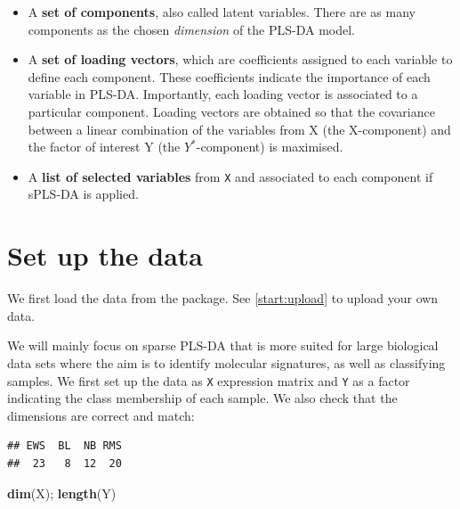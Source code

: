 \documentclass[]{book}
\newenvironment{Shaded}{\begin{snugshade}}{\end{snugshade}}
\newcommand{\KeywordTok}[1]{\textcolor[rgb]{0.13,0.29,0.53}{\textbf{#1}}}
\newcommand{\NormalTok}[1]{#1}
\newcommand{\OperatorTok}[1]{\textcolor[rgb]{0.81,0.36,0.00}{\textbf{#1}}}
\newcommand{\StringTok}[1]{\textcolor[rgb]{0.31,0.60,0.02}{#1}}
\begin{document}
\begin{itemize}
\item
  A \textbf{set of components}, also called latent variables. There are as many components as the chosen
  \emph{dimension} of the PLS-DA model.
\item
  A \textbf{set of loading vectors}, which are coefficients assigned to each variable to define each component. These coefficients indicate the importance of each variable in PLS-DA. Importantly, each loading vector is associated to a particular component. Loading vectors are obtained so that the covariance between a linear combination of the variables from X (the X-component) and the factor of interest Y (the \(Y^*\)-component) is maximised.
\item
  A \textbf{list of selected variables} from \texttt{X} and associated to each component if sPLS-DA is applied.
\end{itemize}

\hypertarget{set-up-the-data}{%
\section{Set up the data}\label{set-up-the-data}}

We first load the data from the package. See \ref{start:upload} to upload your own data.

We will mainly focus on sparse PLS-DA that is more suited for large biological data sets where the aim is to identify molecular signatures, as well as classifying samples. We first set up the data as \texttt{X} expression matrix and \texttt{Y} as a factor indicating the class membership of each sample. We also check that the dimensions are correct and match:

\begin{Shaded}
\end{Shaded}

\begin{verbatim}
## EWS  BL  NB RMS 
##  23   8  12  20
\end{verbatim}

\begin{Shaded}
\begin{Highlighting}[]
\KeywordTok{dim}\NormalTok{(X); }\KeywordTok{length}\NormalTok{(Y)}
\end{Highlighting}
\end{Shaded}
\end{document}
